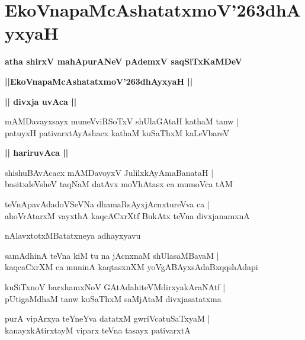 \documentclass[twoside,12pt,openright]{book}
\def\S{\char'263}
\newcounter{shloka}[chapter]
\def\uvaca#1{\centerline{{\large\textbf{#1}}}}
\begin{document}
\chapter{EkoVnapaMcAshatatxmoV\S dhAyxyaH}

\begin{center}
{\LARGE\bfseries atha shirxV mahApurANeV pAdemxV saqSiTxKaMDeV}
\end{center}

\begin{center}
{\LARGE\bfseries ||EkoVnapaMcAshatatxmoV\S dhAyxyaH || }
\end{center}

\uvaca{|| divxja uvAca ||}

\begin{shloka}%
mAMDavayxsayx muneVviRSoTxV shUlaGAtaH kathaM tanw |\\
patuyxH pativarxtAyAshacx kathaM kuSaThxM kaLeVbareV
\end{shloka}

\uvaca{|| hariruvAca ||}

\begin{shloka}%
shishuBAvAcacx mAMDavoyxV JulilxkAyAmaBanataH |\\
basitxdeVsheV taqNaM datAvx moVhAtasx ca mumoVca tAM 
\end{shloka}

\begin{shloka}%
teVnApavAdadoVSeVNa dhamaRsAyxjAcnxtureVva ca |\\
ahoVrAtarxM vayxthA kaqcACxrXtf BukAtx teVna divxjanamxnA	
\end{shloka}

\begin{center}
nAlavxtotxMBatatxneya adhayxyavu
\end{center}

\begin{shloka}%
samAdhinA teVna kiM tu na jAcnxnaM shUlasaMBavaM |\\
kaqcaCxrXM ca muninA kaqtasxnXM yoVgABAyxsAdaBxqqshAdapi
\end{shloka}

\begin{shloka}%
kuSiTxnoV barxhamxNoV GAtAdahiteVMdirxyakAraNAtf |\\
pUtigaMdhaM tanw kuSaThxM saMjAtaM divxjasatatxma
\end{shloka}

\begin{shloka}%
purA vipArxya teYneYva datatxM gwriVcatuSaTxyaM |\\
kanayxkAtirxtayM viparx teVna tasayx pativarxtA 
\end{shloka}
\end{document}
